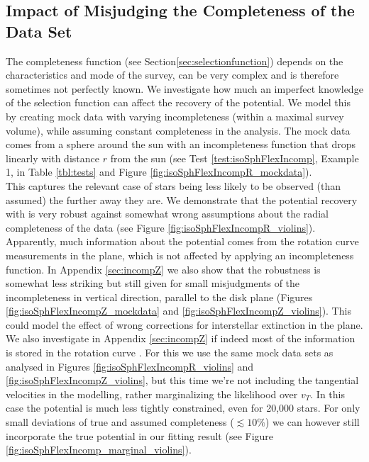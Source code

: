\subsection{Impact of Misjudging the Completeness of the Data Set} \label{sec:results_incompR}

The completeness function (see Section\ref{sec:selectionfunction}) depends on the characteristics and mode of the survey, can be very complex and is therefore sometimes not perfectly known. We investigate how much an imperfect knowledge of the selection function can affect the recovery of the potential. We model this by creating mock data with varying incompleteness (within a maximal survey volume), while assuming constant completeness in the analysis. The mock data comes from a sphere around the sun with an incompleteness function that drops linearly with distance $r$ from the sun (see Test \ref{test:isoSphFlexIncomp}, Example 1, in Table \ref{tbl:tests} and Figure \ref{fig:isoSphFlexIncompR_mockdata}).
\\This captures the relevant case of stars being less likely to be observed (than assumed) the further away they are. We demonstrate that the potential recovery with \RM{} is very robust against somewhat wrong assumptions about the radial completeness of the data (see Figure \ref{fig:isoSphFlexIncompR_violins}). Apparently, much information about the potential comes from the rotation curve measurements in the plane, which is not affected by applying an incompleteness function. In Appendix \ref{sec:incompZ} we also show that the robustness is somewhat less striking but still given for small misjudgments of the incompleteness in vertical direction, parallel to the disk plane (Figures \ref{fig:isoSphFlexIncompZ_mockdata} and \ref{fig:isoSphFlexIncompZ_violins}). This could model the effect of wrong corrections for interstellar extinction in the plane. We also investigate in Appendix \ref{sec:incompZ} if indeed most of the information is stored in the rotation curve . For this we use the same mock data sets as analysed in Figures \ref{fig:isoSphFlexIncompR_violins} and \ref{fig:isoSphFlexIncompZ_violins}, but this time we’re not including the tangential velocities in the modelling, rather marginalizing the likelihood over $v_T$. In this case the potential is much less tightly constrained, even for 20,000 stars. For only small deviations of true and assumed completeness ($\lesssim 10\%$) we can however still incorporate the true potential in our fitting result (see Figure \ref{fig:isoSphFlexIncomp_marginal_violins}). 



